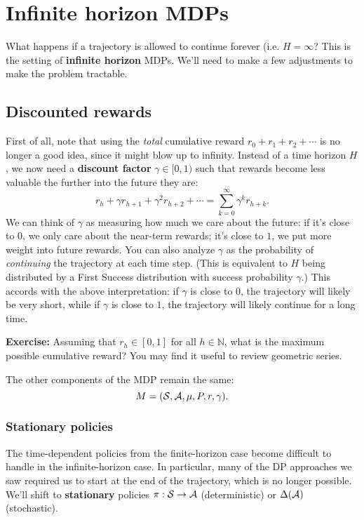 \documentclass[../main/main]{subfiles}
\begin{document}
\newpage

\section{Infinite horizon MDPs}

What happens if a trajectory is allowed to continue forever (i.e. $H = \infty$? This is the setting of \textbf{infinite horizon} MDPs. We'll need to make a few adjustments to make the problem tractable.

\subsection{Discounted rewards}


First of all, note that using the \emph{total} cumulative reward $r_0 + r_1 + r_2 + \cdots$ is no longer a good idea, since it might blow up to infinity. Instead of a time horizon $H$, we now need a \textbf{discount factor} $\gamma \in [0, 1)$ such that rewards become less valuable the further into the future they are:
\[
    r_h + \gamma r_{h+1} + \gamma^2 r_{h+2} + \cdots = \sum_{k=0}^\infty \gamma^k r_{h+k}.
\]
We can think of $\gamma$ as measuring how much we care about the future: if it's close to $0$, we only care about the near-term rewards; it's close to $1$, we put more weight into future rewards. You can also analyze $\gamma$ as the probability of \emph{continuing} the trajectory at each time step. (This is equivalent to $H$ being distributed by a First Success distribution with success probability $\gamma$.) This accords with the above interpretation: if $\gamma$ is close to $0$, the trajectory will likely be very short, while if $\gamma$ is close to $1$, the trajectory will likely continue for a long time.

\textbf{Exercise:} Assuming that $r_h \in [0, 1]$ for all $h \in \mathbb{N}$, what is the maximum possible cumulative reward? You may find it useful to review geometric series.

The other components of the MDP remain the same:
\[ M = (\mathcal{S}, \mathcal{A}, \mu, P, r, \gamma). \]

\subsubsection{Stationary policies}

The time-dependent policies from the finite-horizon case become difficult to handle in the infinite-horizon case. In particular, many of the DP approaches we saw required us to start at the end of the trajectory, which is no longer possible. We'll shift to \textbf{stationary} policies $\pi : \mathcal{S} \to \mathcal{A}$ (deterministic) or $\Delta(\mathcal{A})$ (stochastic).
\end{document}
